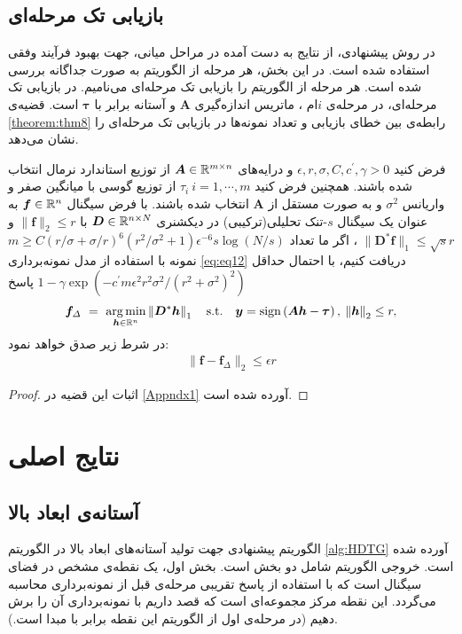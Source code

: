 \subsection{بازیابی تک مرحله‌ای}
در روش پیشنهادی، از نتایج به دست آمده در مراحل میانی، جهت بهبود فرآیند وفقی استفاده شده است. در این بخش، هر مرحله از الگوریتم به صورت جداگانه بررسی شده است. هر مرحله از الگوریتم را بازیابی تک مرحله‌ای
می‌نامیم. در بازیابی تک مرحله‌ای، در مرحله‌ی 
$i$ام
 ، ماتریس اندازه‌گیری
 $ \bm{A} $
 و آستانه برابر با
 $ \bm{\tau} $
 است.
 قضیه‌ی 
 \ref{theorem:thm8}
 رابطه‌ی بین خطای بازیابی و تعداد نمونه‌ها در بازیابی تک مرحله‌ای را نشان می‌دهد.
 
\begin{theorem}
\label{theorem:thm8}
فرض کنید
$ \epsilon,r,\sigma,C,c^{\prime},\gamma >0 $
و درایه‌های
$ \bm{A}\in \mathbb{R}^{m\times n} $
 از توزیع استاندارد نرمال انتخاب شده باشند. همچنین فرض کنید
 $ \tau_{i}~ i=1,\cdots,m $
 از توزیع گوسی با میانگین صفر و واریانس 
$ \sigma^{2} $
و به صورت مستقل از
$ \bm{A} $
انتخاب شده باشند. با فرض سیگنال
$ \bm{f}\in \mathbb{R}^{n} $
به عنوان یک سیگنال 
$ s $-تنک
تحلیلی(ترکیبی)
در دیکشنری
$\bm{D}\in \mathbb{R}^{n\times N}$
با 
$ \|\bm{f}\|_{2}\leq r $
و
$ \|\bm{D}^{\ast}\bm{f}\|_{1}\leq \sqrt{s} r $
، اگر ما تعداد
$ m \geq C(r/\sigma+\sigma / r)^{6}(r^{2}/\sigma^2+1)\epsilon^{-6}s \log (N/s) $ 
نمونه با استفاده از مدل نمونه‌برداری
\eqref{eq:eq12}
دریافت کنیم، با احتمال حداقل
$ 1-\gamma \exp{(-c^{\prime}m \epsilon^{2} r^2\sigma^2/ (r^2+\sigma^2)^2)} $
پاسخ
\begin{align}
\label{eq:SSR}
 \bm{f}_{\varDelta}~=~\mathop{\arg\min}_{\bm{h}\in \mathbb{R}^{n} } \left\lVert\bm{D}^{*}\bm{h}\right\rVert_{1}\quad \text{s.t.} \quad   \bm{y} = \text{sign}\left(\bm{A}\bm{h}-\bm{\tau}\right), \: \left\lVert\bm{h}\right\rVert_{2}\leq r,
\end{align}
 در شرط زیر صدق خواهد نمود:
\begin{align}
\|\bm{f}-\bm{f}_{\varDelta}\|_{2}\leq \epsilon r
\end{align}
\end{theorem}
\begin{proof}
اثبات این قضیه در 
\ref{Appndx1}
آورده شده است.
\end{proof}

\section{نتایج اصلی}

\subsection{آستانه‌ی ابعاد بالا}
الگوریتم پیشنهادی جهت تولید آستانه‌های ابعاد بالا در الگوریتم
\ref{alg:HDTG}
آورده شده است. خروجی الگوریتم شامل دو بخش است. بخش اول، یک نقطه‌ی مشخص در فضای سیگنال است که با استفاده از پاسخ تقریبی مرحله‌ی قبل از نمونه‌برداری محاسبه می‌گردد. این نقطه مرکز مجموعه‌ای است که قصد داریم با نمونه‌برداری آن را برش دهیم (در مرحله‌ی اول از الگوریتم این نقطه برابر با مبدا است.). 


